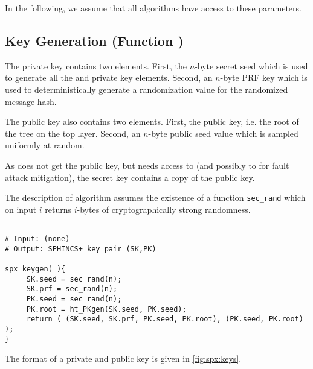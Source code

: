 In the following, we assume that all algorithms have access to these parameters.

\subsection{\spx Key Generation (Function \spxkgen)}

   The \spx private key contains two elements. First, the $n$-byte secret seed 
   \sseed which is used to generate all the \wotsp and \fors private key elements. 
   Second, an $n$-byte PRF key \skprf which is used to deterministically 
   generate a randomization value for the randomized message hash. 

   The \spx public key also contains two elements. First, the \hyper public key, 
   i.e. the root of the tree on the top layer. Second, an $n$-byte public seed
   value \pseed which is sampled uniformly at random.
   
   As \spxsign does not get the public key, but needs access to \pseed (and 
   possibly to \proot for fault attack mitigation), the \spx secret key contains 
   a copy of the public key.
   
   The description of algorithm \spxkgen assumes the existence of a function 
   \texttt{sec\_rand} which on input $i$ returns $i$-bytes of cryptographically strong
   randomness.

\begin{lstlisting}[label=alg:spx:pkgen, language=pseudoc,
                   caption=\spxkgen\ -- Generate a \spx key pair.]

# Input: (none)
# Output: SPHINCS+ key pair (SK,PK)

spx_keygen( ){          
     SK.seed = sec_rand(n);
     SK.prf = sec_rand(n);
     PK.seed = sec_rand(n);
     PK.root = ht_PKgen(SK.seed, PK.seed);
     return ( (SK.seed, SK.prf, PK.seed, PK.root), (PK.seed, PK.root) );
}

\end{lstlisting}

    The format of a \spx private and public key is given in \autoref{fig:spx:keys}.

